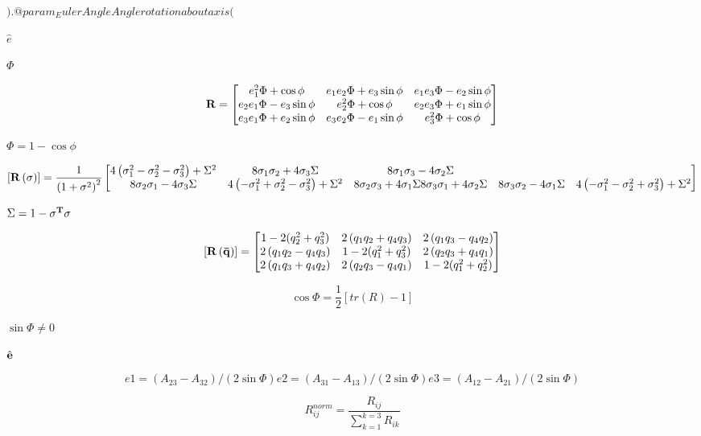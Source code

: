 \documentclass{article}
\begin{document}
$). @param _EulerAngle Angle rotation about axis ($
\pagebreak

$\hat{e}$
\pagebreak

$\Phi$
\pagebreak

\[ \bf{R} = \begin{bmatrix} e^{2}_1 \Phi + \cos{\phi} & e_1 e_2 \Phi + e_3\sin{\phi} & e_1 e_3 \Phi - e_2\sin{\phi}\\ e_2 e_1 \Phi - e_3\sin{\phi} & e^{2}_2 \Phi + \cos{\phi} & e_2 e_3 \Phi + e_1\sin{\phi}\\ e_3 e_1 \Phi + e_2\sin{\phi} & e_3 e_2 \Phi - e_1\sin{\phi} & e^{2}_3 \Phi + \cos{\phi} \end{bmatrix} \]
\pagebreak

$\Phi= 1 - \cos{\phi}$
\pagebreak

\[ \left[\bf{R}\left(\bf{\sigma}\right)\right] = \frac{1}{\left(1+\sigma^2\right)^2} \begin{bmatrix} 4\left(\sigma^{2}_1-\sigma^{2}_2-\sigma^{2}_3\right)+\Sigma^2 & 8\sigma_1\sigma_2+4\sigma_3\Sigma & 8\sigma_1\sigma_3-4\sigma_2\Sigma\\ 8\sigma_2\sigma_1-4\sigma_3\Sigma & 4\left(-\sigma^{2}_1+\sigma^{2}_2-\sigma^{2}_3\right)+\Sigma^2 & 8\sigma_2\sigma_3+4\sigma_1\Sigma 8\sigma_3\sigma_1+4\sigma_2\Sigma & 8\sigma_3\sigma_2-4\sigma_1\Sigma & 4\left(-\sigma^{2}_1-\sigma^{2}_2+\sigma^{2}_3\right)+\Sigma^2 \end{bmatrix} \]
\pagebreak

$\Sigma=1-\bf{\sigma}^T\bf{\sigma}$
\pagebreak

\[ \left[\bf{R}\left(\bf{\bar{q}}\right)\right] = \begin{bmatrix} 1-2(q_{2}^{2}+q_{3}^{2}) & 2\left(q_1 q_2 + q_4 q_3\right) & 2\left(q_1 q_3 - q_4 q_2\right)\\ 2\left(q_1 q_2 - q_4 q_3\right) & 1-2(q_{1}^{2}+q_{3}^{2}) & 2\left(q_2 q_3 + q_4 q_1\right)\\ 2\left(q_1 q_3 + q_4 q_2\right) & 2\left(q_2 q_3 - q_4 q_1\right) & 1-2(q_{1}^{2}+q_{2}^{2}) \end{bmatrix} \]
\pagebreak

\[ \cos\Phi = \frac{1}{2}\left[tr\left(R\right)-1\right] \]
\pagebreak

$\sin\Phi \ne 0$
\pagebreak

$\hat{\bf e}$
\pagebreak

\[ e1 = (A_{23} - A_{32})/(2\sin\Phi) e2 = (A_{31} - A_{13})/(2\sin\Phi) e3 = (A_{12} - A_{21})/(2\sin\Phi) \]
\pagebreak

\[R_{ij}^{norm} = \frac{R_{ij}}{\sum_{k=1}^{k=3}{R_{ik}}}\]
\pagebreak
\end{document}

